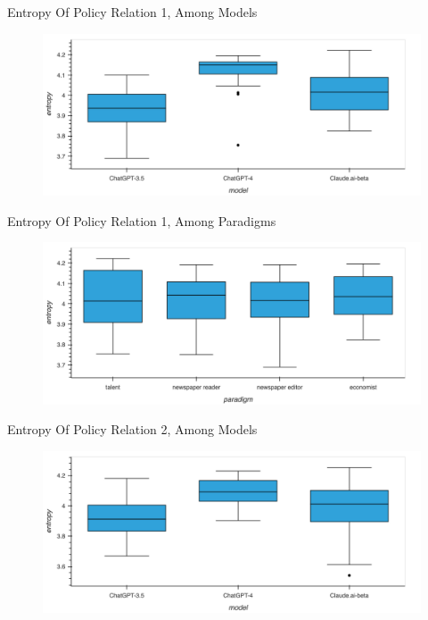 \documentclass[12pt]{beamer}
\begin{document}
\begin{frame}{Entropy Of Policy Relation 1, Among Models}
\begin{figure}[H]
\centering
\includegraphics[width=11.5cm]{Figures/fig15.png}
\end{figure}
\end{frame}


\begin{frame}{Entropy Of Policy Relation 1, Among Paradigms}
\begin{figure}[H]
\centering
\includegraphics[width=11.5cm]{Figures/fig16.png}
\end{figure}
\end{frame}


\begin{frame}{Entropy Of Policy Relation 2, Among Models}
\begin{figure}[H]
\centering
\includegraphics[width=11.5cm]{Figures/fig17.png}
\end{figure}
\end{frame}
\end{document}
